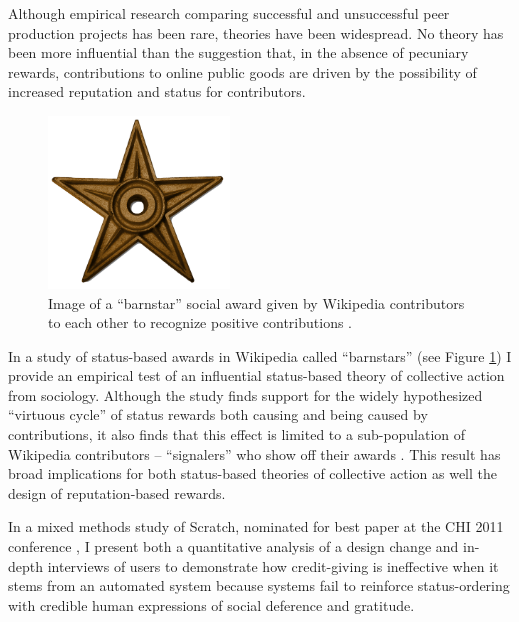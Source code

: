 \documentclass[10pt]{memoir}
\begin{document}
Although empirical research comparing successful and unsuccessful peer
production projects has been rare, theories have been widespread. No
theory has been more influential than the suggestion that, in the
absence of pecuniary rewards, contributions to online public goods are
driven by the possibility of increased reputation and status for
contributors.

\begin{figure}
 \vspace{-1em}
 \begin{centering}
 \includegraphics[width=1.9in]{figures/barnstar_alone.png}
 \caption{Image of a ``barnstar'' social award given by Wikipedia
   contributors to each other to recognize positive contributions .}
 \label{fig:barnstar}
 \end{centering}
 \vspace{-1em}
\end{figure}

In a study of status-based awards in Wikipedia called ``barnstars''
(see Figure \ref{fig:barnstar}) I provide an empirical test of an
influential status-based theory of collective action from
sociology. Although the study finds support for the widely
hypothesized ``virtuous cycle'' of status rewards both causing and
being caused by contributions, it also finds that this effect is
limited to a sub-population of Wikipedia contributors -- ``signalers''
who show off their awards \cite{hill_status_2012}. This result
has broad implications for both status-based theories of collective
action as well the design of reputation-based rewards.

In a mixed methods study of Scratch, nominated for best paper at the
CHI 2011 conference \cite{monroy-hernandez_computers_2011}, I
present both a quantitative analysis of a design change and in-depth
interviews of users to demonstrate how credit-giving is ineffective
when it stems from an automated system because systems fail to
reinforce status-ordering with credible human expressions of social
deference and gratitude.
\end{document}
